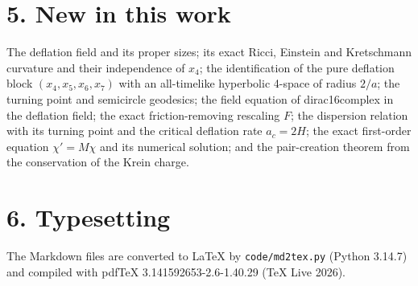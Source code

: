 \documentclass[10pt]{article}
\begin{document}
\section*{5. New in this work}

The deflation field and its proper sizes; its exact Ricci, Einstein and Kretschmann curvature and their independence of $x_4$; the identification of the pure deflation block $(x_4, x_5, x_6, x_7)$ with an all-timelike hyperbolic 4-space of radius $2/a$; the turning point and semicircle geodesics; the field equation of dirac16complex in the deflation field; the exact friction-removing rescaling $F$; the dispersion relation with its turning point and the critical deflation rate $a_c = 2H$; the exact first-order equation $\chi' = M\chi$ and its numerical solution; and the pair-creation theorem from the conservation of the Krein charge.


\section*{6. Typesetting}

The Markdown files are converted to LaTeX by \texttt{code/md2tex.py} (Python 3.14.7) and compiled with pdfTeX 3.141592653-2.6-1.40.29 (TeX Live 2026).
\end{document}
